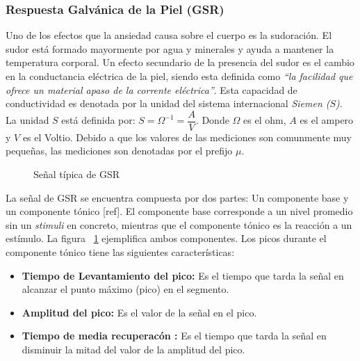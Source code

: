 	\subsubsection{Respuesta Galv\'anica de la Piel (GSR)}\label{secc:gsr}
	Uno de los efectos que la ansiedad causa sobre el cuerpo es la sudoraci\'on. El sudor est\'a formado mayormente por agua y minerales y ayuda a mantener la temperatura corporal. Un efecto secundario de la presencia del sudor es el cambio en la conductancia el\'ectrica de la piel, siendo esta definida como \textit{``la facilidad que ofrece un material apaso de la corrente el\'ectrica''}. Esta capacidad de conductividad es denotada por la unidad del sistema internacional \textit{Siemen ($S$)}. La unidad $S$ est\'a definida por: $S = \Omega^{-1} = \dfrac{A}{V}$. Donde $\Omega$ es el ohm, $A$ es el ampero y $V$ es el Voltio. Debido a que los valores de las mediciones son comunmente muy peque\~nas, las mediciones son denotadas por el prefijo $\mu$.
	\begin{figure}[h]
		\centering
		\caption{Se\~nal t\'ipica de GSR \label{fig:GSRsignal}}
	\end{figure}

		La se\~nal de GSR se encuentra compuesta por dos partes: Un componente base y un componente t\'onico [ref]. El componente base corresponde a un nivel promedio sin un \textit{stimuli} en concreto, mientras que el componente t\'onico es la reacci\'on a un est\'imulo. La figura ~\ref{fig:GSRsignal} ejemplifica ambos componentes. Los picos durante el componente t\'onico tiene las siguientes caracter\'isticas:

\begin{itemize}
        \item{\textbf{Tiempo de Levantamiento del pico:}} Es el tiempo que tarda la se\~nal en alcanzar el punto m\'aximo (pico) en el segmento.
        \item{\textbf{Amplitud del pico:}} Es el valor de la se\~nal en el pico.
        \item{\textbf{Tiempo de media recuperac\'on :}} Es el tiempo que tarda la se\~nal en disminuir la mitad del valor de la amplitud del pico.
\end{itemize}


